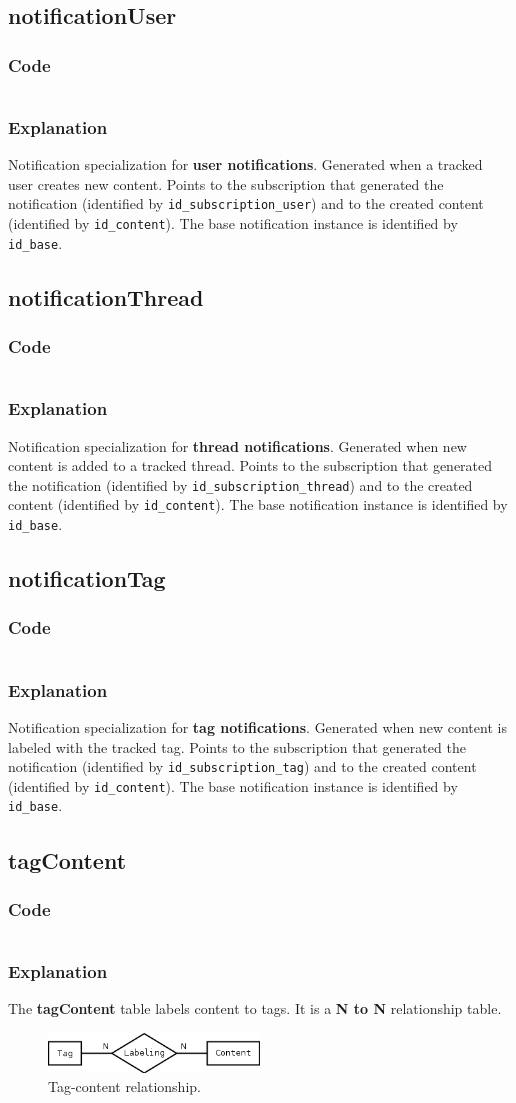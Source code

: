 \documentclass[12pt]{report}
\renewcommand\emph{\textbf}
\newcommand{\printSQLtest}[1]
{
    \inputminted[linenos, breaklines, breakbytoken, tabsize=4, fontsize=\footnotesize]{mysql}{#1}
}
\newcommand{\printSQLTablepage}[2]
{    
    \subsection{#2}
    \subsubsection{Code}
    \printSQLtest{../sql/parts/#1}
    \subsubsection{Explanation}
}
\begin{document}
                \newpage

                \printSQLTablepage{16_tblNotificationUser.sql}{notificationUser}
                    Notification specialization for \emph{user notifications}. Generated when a tracked user creates new content. Points to the subscription that generated the notification (identified by \texttt{id_subscription_user}) and to the created content (identified by \texttt{id_content}).
                    The base notification instance is identified by \texttt{id_base}.

                \newpage    

                \printSQLTablepage{17_tblNotificationThread.sql}{notificationThread}
                    Notification specialization for \emph{thread notifications}. Generated when new content is added to a tracked thread. Points to the subscription that generated the notification (identified by \texttt{id_subscription_thread}) and to the created content (identified by \texttt{id_content}).
                    The base notification instance is identified by \texttt{id_base}.

                \newpage

                \printSQLTablepage{18_tblNotificationTag.sql}{notificationTag}
                    Notification specialization for \emph{tag notifications}. Generated when new content is labeled with the tracked tag. Points to the subscription that generated the notification (identified by \texttt{id_subscription_tag}) and to the created content (identified by \texttt{id_content}).
                    The base notification instance is identified by \texttt{id_base}.

                \newpage

                \printSQLTablepage{19_tblTagContent.sql}{tagContent}
                    The \emph{tagContent} table labels content to tags.
                    It is a \emph{N to N} relationship table.

                    \begin{figure}[!htb]
                    \caption{Tag-content relationship.}
                    \centering
                    \includegraphics[width=0.5\textwidth]{td/19tagcontent}
                    \end{figure}
\end{document}
